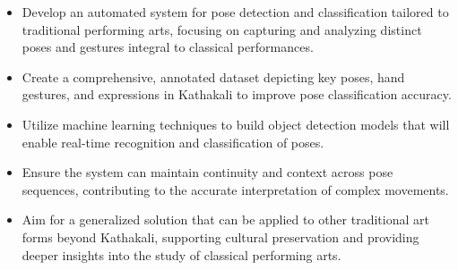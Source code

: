 \begin{itemize}
    \item Develop an automated system for pose detection and classification tailored to traditional performing arts, focusing on capturing and analyzing distinct poses and gestures integral to classical performances.
    \item Create a comprehensive, annotated dataset depicting key poses, hand gestures, and expressions in Kathakali to improve pose classification accuracy.
    \item Utilize machine learning techniques to build object detection models that will enable real-time recognition and classification of poses.
    \item Ensure the system can maintain continuity and context across pose sequences, contributing to the accurate interpretation of complex movements.
    \item Aim for a generalized solution that can be applied to other traditional art forms beyond Kathakali, supporting cultural preservation and providing deeper insights into the study of classical performing arts.
\end{itemize}


\clearpage










